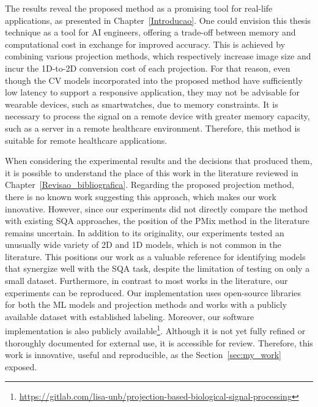 The results reveal the proposed method as a promising tool for real-life applications, as presented in Chapter~\ref{Introducao}.
One could envision this thesis technique as a tool for \gls{AI} engineers, offering a trade-off between memory and computational cost in exchange for improved accuracy. This is achieved by combining various projection methods, which respectively increase image size and incur the 1D-to-2D conversion cost of each projection.
For that reason, even though the \gls{CV} models incorporated into the proposed method have sufficiently low latency to support a responsive application, they may not be advisable for wearable devices, such as smartwatches, due to memory constraints.
It is necessary to process the signal on a remote device with greater memory capacity, such as a server in a remote healthcare environment.
Therefore, this method is suitable for remote healthcare applications.




When considering the experimental results and the decisions that produced them, it is possible to understand the place of this work in the literature reviewed in Chapter~\ref{Revisao_bibliografica}.
Regarding the proposed projection method, there is no known work suggesting this approach, which makes our work innovative. However, since our experiments did not directly compare the method with existing \gls{SQA} approaches, the position of the \gls{PMix} method in the literature remains uncertain.
In addition to its originality, our experiments tested an unusually wide variety of 2D and 1D models, which is not common in the literature. This positions our work as a valuable reference for identifying models that synergize well with the \gls{SQA} task, despite the limitation of testing on only a small dataset.
Furthermore, in contrast to most works in the literature, our experiments can be reproduced. Our implementation uses open-source libraries for both the \gls{ML} models and projection methods and works with a publicly available dataset with established labeling. Moreover, our software implementation is also publicly available\footnote{\url{https://gitlab.com/lisa-unb/projection-based-biological-signal-processing}}. Although it is not yet fully refined or thoroughly documented for external use, it is accessible for review.
Therefore, this work is innovative, useful and reproducible, as the Section~\ref{sec:my_work} exposed.

